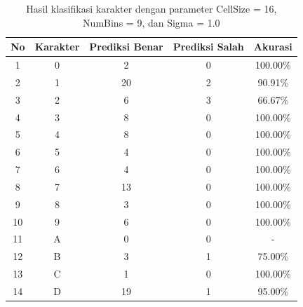 \begin{longtable}[c]{|c|c|c|c|c|}
	\caption{Hasil klasifikasi karakter dengan parameter CellSize = 16, NumBins = 9, dan Sigma = 1.0}
	\label{tab:hasilklasifikasisel16}\\
	\hline
	\textbf{No} & \textbf{Karakter} & \textbf{Prediksi Benar} & \textbf{Prediksi Salah} & \textbf{Akurasi} \\ \hline
	\endhead
	1           & 0                 & 2                       & 0                       &100.00\%            \\ \hline
	2           & 1                 & 20                       & 2                       &90.91\%            \\ \hline
	3           & 2                 & 6                       & 3                       &66.67\%            \\ \hline
	4           & 3                 & 8                       & 0                       &100.00\%            \\ \hline
	5           & 4                 & 8                       & 0                       &100.00\%            \\ \hline
	6           & 5                 & 4                       & 0                       &100.00\%            \\ \hline
	7           & 6                 & 4                       & 0                       &100.00\%            \\ \hline
	8           & 7                 & 13                       & 0                       &100.00\%            \\ \hline
	9           & 8                 & 3                       & 0                       &100.00\%            \\ \hline
	10           & 9                 & 6                       & 0                       &100.00\%            \\ \hline
	11           & A                 & 0                       & 0                       & -            \\ \hline
	12           & B                 & 3                       & 1                       &75.00\%            \\ \hline
	13           & C                 & 1                       & 0                       &100.00\%            \\ \hline
	14           & D                 & 19                       & 1                       &95.00\%            \\ \hline

\end{longtable}
